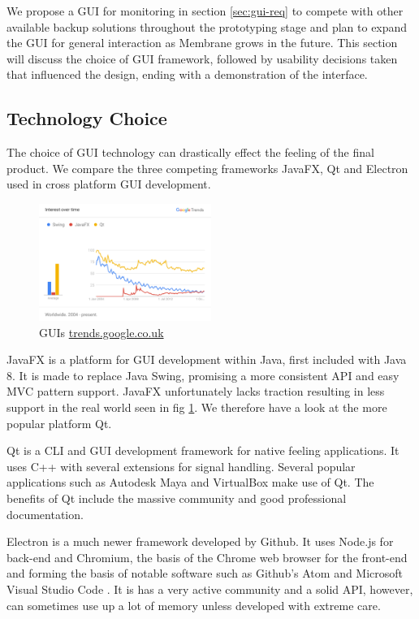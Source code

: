 \documentclass[11pt, a4paper, twocolumn, twoside]{report}
\begin{document}
We propose a GUI for monitoring in section \ref{sec:gui-req} to compete with other available backup solutions throughout the prototyping stage and plan to expand the GUI for general interaction as Membrane grows in the future. This section will discuss the choice of GUI framework, followed by usability decisions taken that influenced the design, ending with a demonstration of the interface.

\subsection{Technology Choice}

The choice of GUI technology can drastically effect the feeling of the final product. We compare the three competing frameworks JavaFX, Qt and Electron used in cross platform GUI development.

\begin{figure}[h]
 \centering
 \includegraphics[width=0.5\textwidth]{gui-trends}
 \caption{GUIs \url{trends.google.co.uk}}
 \label{fig:gui-trends}
\end{figure}

JavaFX is a platform for GUI development within Java, first included with Java 8. It is made to replace Java Swing, promising a more consistent API and easy MVC pattern support. JavaFX unfortunately lacks traction resulting in less support in the real world seen in fig \ref{fig:gui-trends}. We therefore have a look at the more popular platform Qt.

Qt is a CLI and GUI development framework for native feeling applications. It uses C++ with several extensions for signal handling. Several popular applications such as Autodesk Maya and VirtualBox \citep*{oracle2017logging, autodesk2017qt} make use of Qt. The benefits of Qt include the massive community and good professional documentation. \citep{slant2017qtelectron}

Electron is a much newer framework developed by Github. It uses Node.js for back-end and Chromium, the basis of the Chrome web browser for the front-end and forming the basis of notable software such as Github's Atom and Microsoft Visual Studio Code \citep{james2015vselectron}. It is has a very active community and a solid API, however, can sometimes use up a lot of memory unless developed with extreme care.
\end{document}
